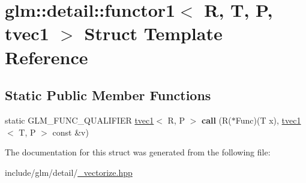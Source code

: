 \hypertarget{structglm_1_1detail_1_1functor1_3_01R_00_01T_00_01P_00_01tvec1_01_4}{}\section{glm\+:\+:detail\+:\+:functor1$<$ R, T, P, tvec1 $>$ Struct Template Reference}
\label{structglm_1_1detail_1_1functor1_3_01R_00_01T_00_01P_00_01tvec1_01_4}
\subsection*{Static Public Member Functions}
\begin{DoxyCompactItemize}
\item 
\mbox{\label{structglm_1_1detail_1_1functor1_3_01R_00_01T_00_01P_00_01tvec1_01_4_af5dd270c9695023917f2c43e61fa10e0}} 
static G\+L\+M\+\_\+\+F\+U\+N\+C\+\_\+\+Q\+U\+A\+L\+I\+F\+I\+ER \hyperlink{structglm_1_1tvec1}{tvec1}$<$ R, P $>$ {\bfseries call} (R($\ast$Func)(T x), \hyperlink{structglm_1_1tvec1}{tvec1}$<$ T, P $>$ const \&v)
\end{DoxyCompactItemize}


The documentation for this struct was generated from the following file\+:\begin{DoxyCompactItemize}
\item 
include/glm/detail/\hyperlink{__vectorize_8hpp}{\+\_\+vectorize.\+hpp}\end{DoxyCompactItemize}
